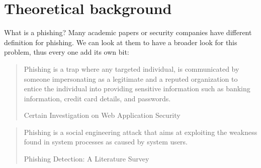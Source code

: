\documentclass[
  digital, %
  oneside, %
  table,   %
  nolof,     %
  nolot,     %
]{fithesis3}
\begin{document}








\chapter{Theoretical background}

What is a phishing? Many academic papers or security companies have different definition for phishing. We can look at them to have a broader look for this problem, thus every one add its own bit:

\blockquote[Certain Investigation on Web Application Security \cite{certain-investigation}][]{
Phishing    is    a    trap    where    any    targeted    individual,    is    communicated  by  someone  impersonating  as  a  legitimate  and  a  reputed  organization  to  entice  the  individual  into  providing  sensitive information such as banking information, credit card details, and  passwords.
}

\par

\blockquote[Phishing Detection: A Literature Survey \cite{literature-survey}][]{
\par Phishing is a social engineering attack that aims at exploiting the weakness found in system processes as caused by system users.
}
\end{document}
